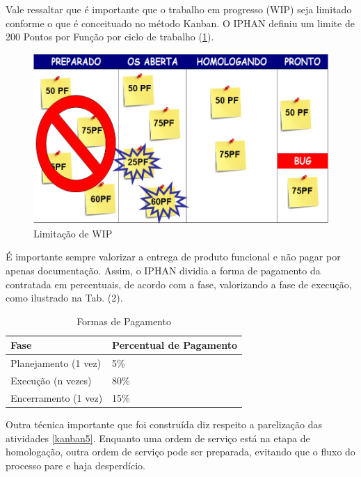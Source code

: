 Vale ressaltar que é importante que o trabalho em progresso (WIP) seja limitado conforme o que é conceituado no método Kanban. O IPHAN definiu um limite de 200 Pontos por Função por ciclo de trabalho (\ref{kanban4}). 

\begin{figure}[h]
		\centering
		
			\includegraphics[scale=0.5]{figuras/kanbanIPHAN4.png}
		\caption{Limitação de WIP \cite{parente}}
		\label{kanban4}
\end{figure}

É importante sempre valorizar a entrega de produto funcional e não pagar por apenas documentação. Assim, o IPHAN dividia a forma de pagamento da contratada em percentuais, de acordo com a fase, valorizando a fase de execução, como ilustrado na Tab. (2).


\begin{table}[H]
\center
\footnotesize
\begin{tabular}{|p{6cm}|p{6cm}|}
  \hline
   \textbf{Fase} & \textbf{Percentual de Pagamento}\\
    \hline
   Planejamento (1 vez) & 5\%\\
   \hline    
   Execução (n vezes) & 80\%\\
    \hline
   Encerramento (1 vez) & 15\%\\
   \hline
\end{tabular}
\caption{Formas de Pagamento}
\end{table}


Outra técnica importante que foi construída diz respeito a parelização das atividades \ref{kanban5}. Enquanto uma ordem de serviço está na etapa de homologação, outra ordem de serviço pode ser preparada, evitando que o fluxo do processo pare e haja desperdício. 

